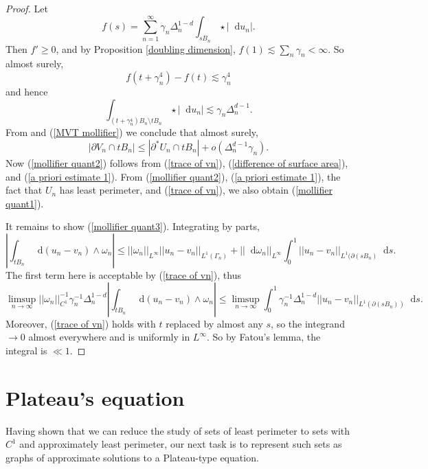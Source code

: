 \documentclass[reqno,12pt,letterpaper]{amsart}
\newcommand*\dif{\mathop{}\!\mathrm{d}}
\theoremstyle{definition}
\numberwithin{equation}{section}
\begin{document}
\begin{proof}
Let
$$f(s) = \sum_{n=1}^\infty \gamma_n \Delta_n^{1 - d} \int_{sB_n} \star |\dif u_n|.$$
Then $f' \geq 0$, and by Proposition \ref{doubling dimension}, $f(1) \lesssim \sum_n \gamma_n < \infty$.
So almost surely,
$$f(t + \gamma_n^4) - f(t) \lesssim \gamma_n^4$$
and hence
$$\int_{(t + \gamma_n^4)B_n \setminus tB_n} \star |\dif u_n| \lesssim \gamma_n \Delta_n^{d - 1}.$$
From \cite[Lemma 7.2]{Giusti77} and (\ref{MVT mollifier}) we conclude that almost surely,
\begin{equation}\label{difference of surface area}
|\partial V_n \cap tB_n| \leq |\partial^* U_n \cap tB_n| + o(\Delta_n^{d - 1} \gamma_n).
\end{equation}
Now (\ref{mollifier quant2}) follows from (\ref{trace of vn}), (\ref{difference of surface area}), and (\ref{a priori estimate 1}).
From (\ref{mollifier quant2}), (\ref{a priori estimate 1}), the fact that $U_n$ has least perimeter, and (\ref{trace of vn}), we also obtain (\ref{mollifier quant1}).

It remains to show (\ref{mollifier quant3}). Integrating by parts,
$$\left|\int_{tB_n} \dif (u_n - v_n) \wedge \omega_n\right| \leq ||\omega_n||_{L^\infty} ||u_n - v_n||_{L^1(\Gamma_n)} + ||\dif \omega_n||_{L^\infty} \int_0^1 ||u_n - v_n||_{L^1(\partial(sB_n)} \dif s.$$
The first term here is acceptable by (\ref{trace of vn}), thus 
$$\limsup_{n \to \infty} ||\omega_n||_{C^1}^{-1} \gamma_n^{-1} \Delta_n^{1 - d} \left|\int_{tB_n} \dif(u_n - v_n) \wedge \omega_n\right| \leq \limsup_{n \to \infty} \int_0^1 \gamma_n^{-1} \Delta_n^{1 - d} ||u_n - v_n||_{L^1(\partial(sB_n))} \dif s.$$
Moreover, (\ref{trace of vn}) holds with $t$ replaced by almost any $s$, so the integrand $\to 0$ almost everywhere and is uniformly in $L^\infty$.
So by Fatou's lemma, the integral is $\ll 1$.
\end{proof}




\section{Plateau's equation}\label{Plateau section}
Having shown that we can reduce the study of sets of least perimeter to sets with $C^1$ and approximately least perimeter, our next task is to represent such sets as graphs of approximate solutions to a Plateau-type equation.
\end{document}
